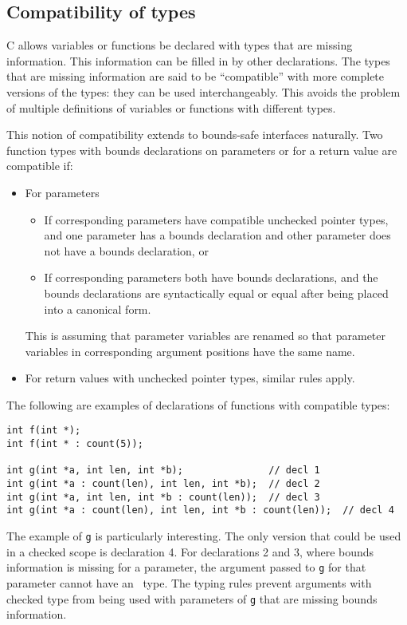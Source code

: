 \subsection{Compatibility of types}

C allows variables or functions be declared with types that are missing information.
This information can be filled in by other declarations.  The types that
are missing information are said to be ``compatible'' with more complete
versions of the types: they can be used interchangeably.   This avoids the
problem of multiple definitions of variables or functions with different types.

This notion of compatibility extends to bounds-safe interfaces naturally.
Two function types with bounds declarations on parameters or for a return value are 
compatible if:
\begin{itemize}
\item For parameters
\begin{itemize}
\item If corresponding parameters have compatible unchecked pointer types, and one parameter
has a bounds declaration and other parameter does not have a bounds declaration, or
\item If corresponding parameters both have bounds declarations, and the
bounds declarations are syntactically equal or equal after being
placed into a canonical form.
\end{itemize}

This is assuming that parameter variables are renamed so that parameter
variables in corresponding argument positions have the same name.

\item For return values with unchecked pointer types, similar rules apply.
\end{itemize}

The following are examples of declarations of functions with compatible types:
\begin{verbatim}
int f(int *);
int f(int * : count(5));

int g(int *a, int len, int *b);               // decl 1
int g(int *a : count(len), int len, int *b);  // decl 2
int g(int *a, int len, int *b : count(len));  // decl 3
int g(int *a : count(len), int len, int *b : count(len));  // decl 4
\end{verbatim}
The example of \texttt{g} is particularly interesting.  The only version
that could be used in a checked scope is declaration 4.   For declarations 2 and 3,
where bounds information is missing for a parameter, the argument passed to \texttt{g}
for that parameter cannot have an \arrayptr\ type.  The typing rules prevent arguments
with checked type from being used with parameters of \texttt{g} that are missing 
bounds information.

